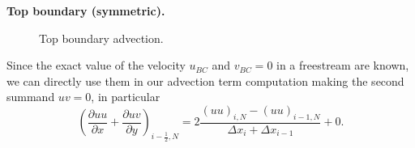 \documentclass{article}
\begin{document}
\textbf{Top boundary (symmetric).}
\begin{figure}[H] %
  \caption{Top boundary advection.}\label{fig:ADV-top}
\end{figure}
Since the exact value of the velocity $u_{BC}$ and $v_{BC}=0$ in a freestream are known, we can directly use them in our advection term computation making the second summand $uv=0$, in particular
\begin{equation}
	\left( \frac{\partial uu}{\partial x}+\frac{\partial uv}{\partial y}\right)_{i-\frac{1}{2},N}=2\frac{\left( uu\right)_{i,N}-\left( uu\right)_{i-1,N}}{\Delta x_i + \Delta x_{i-1}}+0.
\end{equation}
\end{document}

